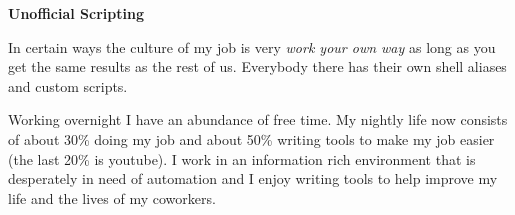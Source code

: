 \documentclass{article}
\begin{document}
\vspace{.5em}
\noindent
\textbf{Unofficial Scripting}

In certain ways the culture of my job is very \emph{work your own way} as long
as you get the same results as the rest of us. Everybody there has their own
shell aliases and custom scripts.

Working overnight I have an abundance of free time. My nightly life now
consists of about 30\% doing my job and about 50\% writing tools to make my job
easier (the last 20\% is youtube). I work in an information rich environment
that is desperately in need of automation and I enjoy writing tools to help
improve my life and the lives of my coworkers.
\end{document}
